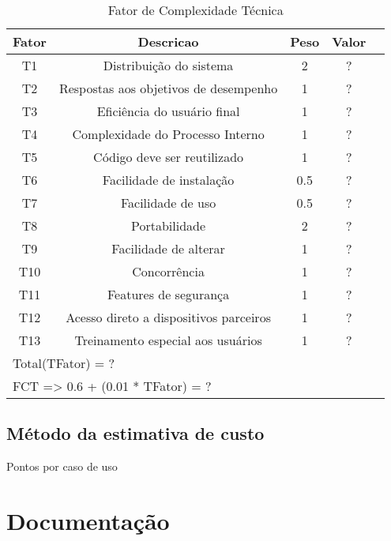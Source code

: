 \begin{table}[!htb]
\caption[FCT]{Fator de Complexidade Técnica}
	\label{tab:correlacao}
	\centering
	\begin{tabular}{c|c|c|c|c}
		Fator 			 & Descricao 																	& Peso & Valor &    \\ \hline
		T1					 & Distribuição do sistema 										&	2		 &	  ?	 &	  \\
		T2					 & Respostas aos objetivos de desempenho      &	1		 &	  ?  &	 	\\
		T3 					 & Eficiência do usuário final                &	1		 &	  ?  &		\\
		T4 					 & Complexidade do Processo Interno           &	1		 &	  ?  &		\\
		T5 					 & Código deve ser reutilizado                &	1		 &	  ?  &		\\
		T6 					 & Facilidade de instalação                   &	0.5  &	  ?  &		\\
		T7 					 & Facilidade de uso                          &	0.5  &	  ?  &		\\
		T8 					 & Portabilidade                              &	2		 &	  ?  &		\\
		T9 					 & Facilidade de alterar                      &	1		 &	  ?  &		\\
		T10					 & Concorrência                               &	1		 &	  ?  &		\\
		T11					 & Features de segurança                      &	1		 &	  ?  &		\\
		T12					 & Acesso direto a dispositivos parceiros     &	1		 &	  ?  &		\\
		T13					 & Treinamento especial aos usuários          &	1		 &	  ?  &		\\ \hline
		\multicolumn{5}{l}{Total(TFator) = ?}\\ \hline
		\multicolumn{5}{l}{FCT => 0.6 + (0.01 * TFator) = ?}\\
	\end{tabular}
\end{table}



\subsection{Método da estimativa de custo}

Pontos por caso de uso

\section{Documentação}

